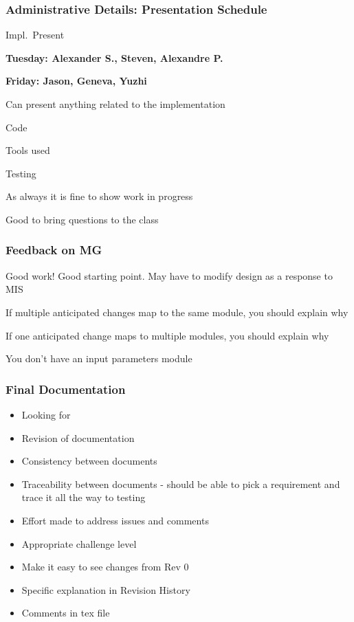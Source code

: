 \documentclass[t,12pt,numbers,fleqn]{beamer}
\begin{document}

\begin{frame}
\frametitle{Administrative Details: Presentation Schedule}

\bi
\item {Impl.\ Present}
\bi
\item \textbf{Tuesday: Alexander S., Steven, Alexandre P.}
\item \textbf{Friday: Jason, Geneva, Yuzhi}
\ei
\item Can present anything related to the implementation
\bi
\item Code
\item Tools used
\item Testing
\item As always it is fine to show work in progress
\item Good to bring questions to the class
\ei
\ei

\end{frame}


\begin{frame}
\frametitle{Feedback on MG}

\bi
\item Good work!  Good starting point.  May have to modify design as a response
  to MIS
\item If multiple anticipated changes map to the same module, you should explain
  why
\item If one anticipated change maps to multiple modules, you should explain why
\item You don't have an input parameters module
\ei

\end{frame}


\begin{frame}
\frametitle{Final Documentation}
\begin{itemize}
\item Looking for 
\bi
\item Revision of documentation
\item Consistency between documents
\item Traceability between documents - should be able to pick a requirement and
  trace it all the way to testing
\item Effort made to address issues and comments
\item Appropriate challenge level
\ei
\item Make it easy to see changes from Rev 0
\bi
\item Specific explanation in Revision History
\item Comments in tex file
\ei
\end{itemize}
\end{frame}
\end{document}
